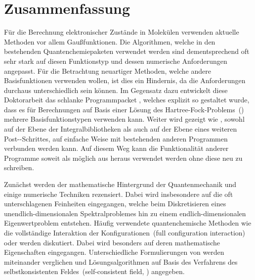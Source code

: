 %
%
\chapter*{Zusammenfassung}
{}

Für die Berechnung elektronischer Zustände in Molekülen
verwenden aktuelle Methoden vor allem Gaußfunktionen.
Die Algorithmen, welche in den bestehenden Quantenchemiepaketen
verwendet werden sind dementsprechend oft sehr stark
auf diesen Funktionstyp und dessen numerische Anforderungen angepasst.
Für die Betrachtung neuartiger Methoden,
welche andere Basisfunktionen verwenden wollen,
ist dies ein Hindernis,
da die Anforderungen durchaus unterschiedlich sein können.
Im Gegensatz dazu entwickelt diese Doktorarbeit
das schlanke Programmpacket \molsturm,
welches explizit so gestaltet wurde,
dass es für Berechnungen auf Basis einer Lösung des Hartree-Fock-Problems~(\HF)
mehrere Basisfunktionstypen verwenden kann.
Weiter wird gezeigt wie \molsturm,
sowohl auf der Ebene der Integralbibliotheken
als auch auf der Ebene eines weiteren Post-\HF-Schrittes,
auf einfache Weise mit bestehenden anderen Programmen
verbunden werden kann.
Auf diesem Weg kann die Funktionalität anderer Programme
soweit als möglich aus \molsturm heraus verwendet werden
ohne diese neu zu schreiben.

Zunächst werden der mathematische Hintergrund der Quantenmechanik
und einige numerische Techniken rezensiert.
Dabei wird insbesondere auf die oft unterschlagenen Feinheiten eingegangen,
welche beim Diskretisieren eines unendlich-dimensionalen Spektralproblemes
hin zu einem endlich-dimensionalen Eigenwertproblem entstehen.
Häufig verwendete quantenchemische Methoden
wie die vollständige Interaktion der Konfigurationen~(full configuration interaction)
oder \HF werden diskutiert.
Dabei wird besonders auf deren mathematische Eigenschaften eingegangen.
Unterschiedliche Formulierungen von \HF werden miteinander verglichen
und
Lösungsalgorithmen auf Basis des Verfahrens des
selbstkonsistenten Feldes~(self-consistent field, \SCF) angegeben.


